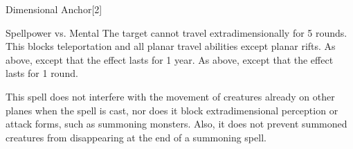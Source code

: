 \begin{spellsection}{Dimensional Anchor}[2]
    \begin{spellheader}
    \end{spellheader}
    \begin{spellcontent}
        \begin{spelltargetinginfo}
        \end{spelltargetinginfo}
        \begin{spelleffects}
            \begin{spellattack}{Spellpower vs. Mental}
                \spellsuccess  The target cannot travel extradimensionally for 5 rounds. This blocks teleportation and all planar travel abilities except planar rifts.
                \spellcritical As above, except that the effect lasts for 1 year.
                \spellfailure As above, except that the effect lasts for 1 round.
            \end{spellattack}
        \end{spelleffects}
    \end{spellcontent}
    \begin{spellfooter}
        \spellnotes This spell does not interfere with the movement of creatures already on other planes when the spell is cast, nor does it block extradimensional perception or attack forms, such as summoning monsters. Also, it does not prevent summoned creatures from disappearing at the end of a summoning spell.
        \miscastrandom
    \end{spellfooter}
    \begin{spellaugments}
    \end{spellaugments}
\end{spellsection}

